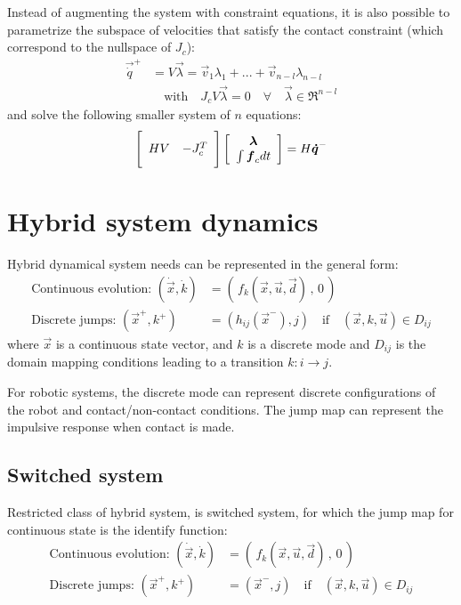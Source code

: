 Instead of augmenting the system with constraint equations,  it is also possible to parametrize the subspace of velocities that satisfy the contact constraint (which correspond to the nullspace of $J_c$):
%
\begin{align}
\vec{\dot{q}}^+ &= V \vec{\lambda} = \vec{v}_1 \lambda_1  + ... + \vec{v}_{n-l} \lambda_{n-l} \\
& \quad \text{with} \quad J_c V \vec{\lambda} = 0 \quad \forall \quad \vec{\lambda} \in \Re^{n-l}
\end{align}
%
and solve the following smaller system of $n$ equations:
%
\begin{align}
\Bigg[ \begin{array}{c c } 	H V & -J_c^T  	\end{array} \Bigg] \left[ \begin{array}{c} \vec{\lambda}  \\ \int{ \vec{f}_c dt }\end{array} \right] = H \vec{\dot{q}}^-
\label{eq:manipulator_impact_eom}
\end{align}


\section{Hybrid system dynamics}

Hybrid dynamical system needs can be represented in the general form:
%
\begin{align}
\text{Continuous evolution: } \left(  \dot{\vec{x}} , \dot{k} \right) &=  \left( \, f_k( \vec{x} , \vec{u} , \vec{d} ) \, , \, 0 \, \right) \\
\text{Discrete jumps: } \left(  \vec{x}^+ , k^+ \right) &=  \left( h_{ij}( \vec{x}^- ) , j \right) \quad\text{if}\quad \left(  \vec{x} , k , \vec{u} \right) \in D_{ij}  
\end{align}
%
where $\vec{x}$ is a continuous state vector, and $k$ is a discrete mode and $D_{ij}$ is the domain mapping conditions leading to a transition $k:i \rightarrow j$.

For robotic systems, the discrete mode can represent discrete configurations of the robot and contact/non-contact conditions. The jump map can represent the impulsive response when contact is made.

\subsection{Switched system}

Restricted class of hybrid system, is switched system, for which the jump map for continuous state is the identify function:
%
\begin{align}
\text{Continuous evolution: } \left(  \dot{\vec{x}} , \dot{k} \right) &=  \left( \, f_k( \vec{x} , \vec{u} , \vec{d} ) \, , \, 0 \, \right) \\
\text{Discrete jumps: } \left(  \vec{x}^+ , k^+ \right) &=  \left( \vec{x}^- , j \right) \quad\text{if}\quad \left(  \vec{x} , k , \vec{u} \right) \in D_{ij} 
\end{align}
%

